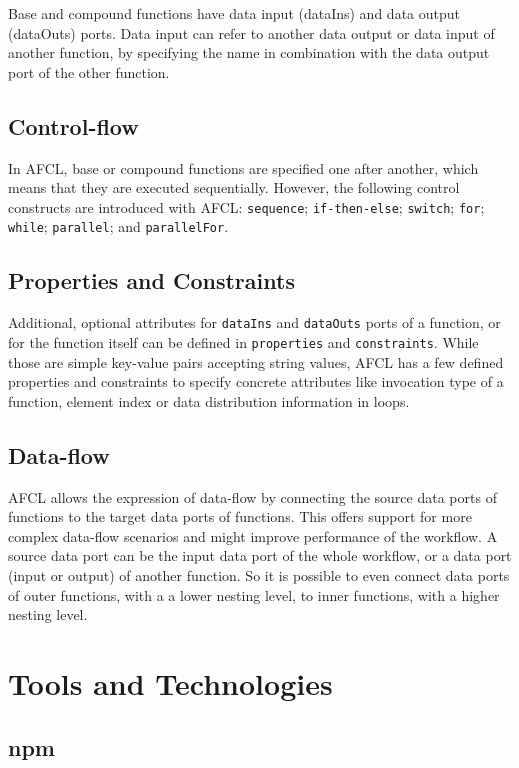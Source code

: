 \documentclass[a4paper,top=25mm,bottom=25mm,12pt,pdftex,halfparskip,twoside,bibtotoc,numbers=noenddot]{scrbook}
\begin{document}
Base and compound functions have data input (dataIns) and data output (dataOuts) ports.
Data input can refer to another data output or data input of another function, by specifying the name in combination with the data output port of the other function.

\subsection{Control-flow}
In AFCL, base or compound functions are specified one after another, which means that they are executed sequentially. However, the following control constructs are introduced with AFCL: \texttt{sequence}; \texttt{if-then-else}; \texttt{switch}; \texttt{for}; \texttt{while}; \texttt{parallel}; and \texttt{parallelFor}.


\subsection{Properties and Constraints}

Additional, optional attributes for \texttt{dataIns} and \texttt{dataOuts} ports of a function, or for the function itself can be defined in \texttt{properties} and \texttt{constraints}. While those are simple key-value pairs accepting string values, AFCL has a few defined properties and constraints to specify concrete attributes like invocation type of a function, element index or data distribution information in loops.

\subsection{Data-flow}
AFCL allows the expression of data-flow by connecting the source data ports of functions to the target data ports of functions. This offers support for more complex data-flow scenarios and might improve performance of the workflow. A source data port can be the input data port of the whole workflow, or a data port (input or output) of another function. So it is possible to even connect data ports of outer functions, with a a lower nesting level, to inner functions, with a higher nesting level. 

\section{Tools and Technologies}
\subsection{npm}
\end{document}
